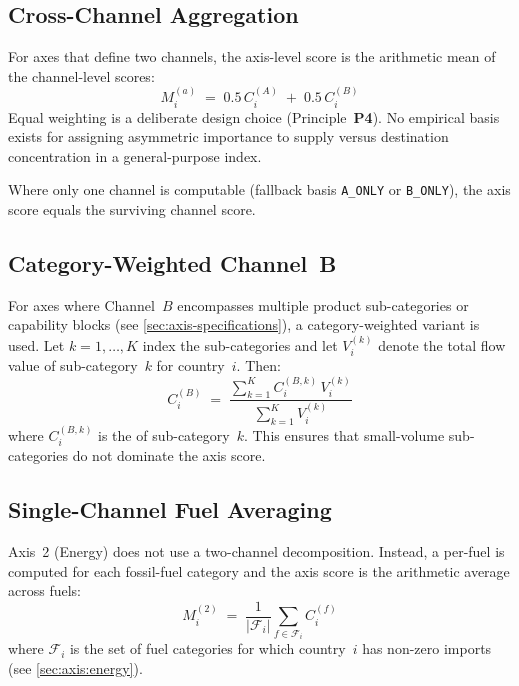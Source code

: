 \subsection{Cross-Channel Aggregation}\label{sec:math:cross-channel}

For axes that define two channels, the axis-level score is the arithmetic
mean of the channel-level scores:
%
\begin{equation}\label{eq:dual-channel}
  M_i^{(a)}
  \;=\;
  0.5\, C_i^{(A)} \;+\; 0.5\, C_i^{(B)}
\end{equation}
%
Equal weighting is a deliberate design choice (Principle~\textbf{P4}).  No
empirical basis exists for assigning asymmetric importance to supply versus
destination concentration in a general-purpose index.

Where only one channel is computable (fallback basis \texttt{A\_ONLY} or
\texttt{B\_ONLY}), the axis score equals the surviving channel score.

\subsection{Category-Weighted Channel~B}\label{sec:math:weighted-b}

For axes where Channel~\(B\) encompasses multiple product sub-categories or
capability blocks (see \cref{sec:axis-specifications}), a category-weighted
variant is used.  Let \(k = 1, \ldots, K\) index the sub-categories and let
\(V_i^{(k)}\) denote the total flow value of sub-category~\(k\) for
country~\(i\).  Then:
%
\begin{equation}\label{eq:weighted-b}
  C_i^{(B)}
  \;=\;
  \frac{\displaystyle\sum_{k=1}^{K} C_i^{(B,k)}\, V_i^{(k)}}
       {\displaystyle\sum_{k=1}^{K} V_i^{(k)}}
\end{equation}
%
where \(C_i^{(B,k)}\) is the \HHI of sub-category~\(k\).  This ensures that
small-volume sub-categories do not dominate the axis score.

\subsection{Single-Channel Fuel Averaging}\label{sec:math:fuel-avg}

Axis~2 (Energy) does not use a two-channel decomposition.  Instead, a
per-fuel \HHI is computed for each fossil-fuel category and the axis score is
the arithmetic average across fuels:
%
\begin{equation}\label{eq:fuel-avg}
  M_i^{(2)}
  \;=\;
  \frac{1}{|\mathcal{F}_i|}
  \sum_{f \in \mathcal{F}_i} C_i^{(f)}
\end{equation}
%
where \(\mathcal{F}_i\) is the set of fuel categories for which
country~\(i\) has non-zero imports (see \cref{sec:axis:energy}).

